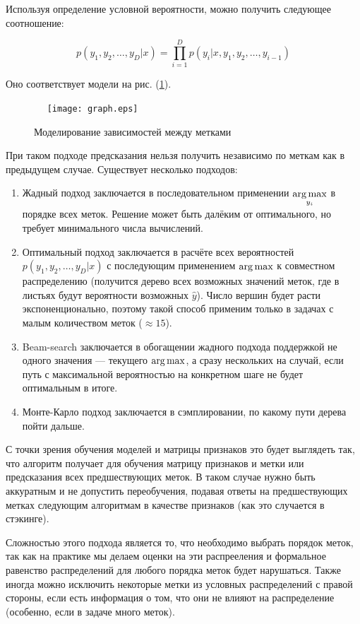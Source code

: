 \documentclass[12pt,fleqn]{article}
\begin{document}
Используя определение условной вероятности, можно получить следующее соотношение:

$$
p(y_1, y_2, \dots, y_D | x) = \prod_{i=1}^{D} p(y_i | x, y_1, y_2, \dots, y_{i - 1})
$$

Оно соответствует модели на рис. (\ref{fig:graph}).

\begin{center}
\begin{figure}[!htb]
 \centering
 \texttt{[image: graph.eps]}
 \caption{Моделирование зависимостей между метками}\label{fig:graph}
\end{figure}
\end{center}

При таком подходе предсказания нельзя получить независимо по меткам как в предыдущем случае. Существует несколько подходов:

\begin{enumerate}
    \item Жадный подход заключается в последовательном применении $\mathop{\rm arg\,max}\limits_{y_i}$ в порядке всех меток. Решение может быть далёким от оптимального, но требует минимального числа вычислений.
    \item Оптимальный подход заключается в расчёте всех вероятностей $p(y_1, y_2, \dots, y_D | x)$ с последующим применением $\mathop{\rm arg\,max}\limits$ к совместном распределению (получится дерево всех возможных значений меток, где в листьях будут вероятности возможных $\hat{y}$). Число вершин будет расти экспоненционально, поэтому такой способ применим только в задачах с малым количеством меток ($\approx 15$).
    \item Beam-search заключается в обогащении жадного подхода поддержкой не одного значения --- текущего $\mathop{\rm arg\,max}\limits$, а сразу нескольких на случай, если путь с максимальной вероятностью на конкретном шаге не будет оптимальным в итоге.
    \item Монте-Карло подход заключается в сэмплировании, по какому пути дерева пойти дальше.
\end{enumerate}

С точки зрения обучения моделей и матрицы признаков это будет выглядеть так, что алгоритм получает для обучения матрицу признаков и метки или предсказания всех предшествующих меток. В таком случае нужно быть аккуратным и не допустить переобучения, подавая ответы на предшествующих метках следующим алгоритмам в качестве признаков (как это случается в стэкинге).

Сложностью этого подхода является то, что необходимо выбрать порядок меток, так как на практике мы делаем оценки на эти распрееления и формальное равенство распределений для любого порядка меток будет нарушаться. Также иногда можно исключить некоторые метки из условных распределений с правой стороны, если есть информация о том, что они не влияют на распределение (особенно, если в задаче много меток).
\end{document}
